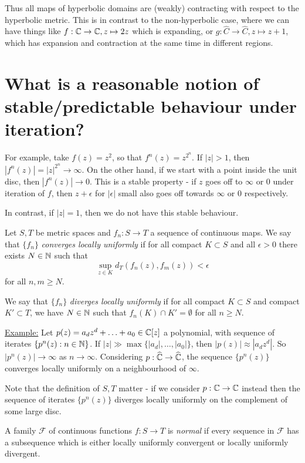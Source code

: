 \documentclass[10pt,a4paper]{article}
\begin{document}
Thus all maps of hyperbolic domains are (weakly) contracting with respect to the hyperbolic metric. This is in contrast to the non-hyperbolic case, where we can have things like $f:\mathbb{C} \to \mathbb{C}, z \mapsto 2z$ which is expanding, or $g:\hat{C} \to \hat{C}, z\mapsto z+1$, which has expansion and contraction at the same time in different regions.

\section{What is a reasonable notion of stable/predictable behaviour under iteration?}

For example, take $f(z) = z^2$, so that $f^n(z) = z^{2^n}$. If $|z| > 1$, then $|f^n(z)| = |z|^{2^n} \to \infty$. On the other hand, if we start with a point inside the unit disc, then $|f^n(z)| \to 0$. This is a stable property - if $z$ goes off to $\infty$ or $0$ under iteration of $f$, then $z+\epsilon$ for $|\epsilon|$ small also goes off towards $\infty$ or 0 respectively.

In contrast, if $|z|=1$, then we do not have this stable behaviour.

\begin{definition}
  Let $S, T$ be metric spaces and $f_n : S \to T$ a sequence of continuous maps. We say that $\{f_n\}$ \emph{converges locally uniformly} if for all compact $K \subset S$ and all $\epsilon >0$ there exists $N \in \mathbb{N}$ such that
  \[
    \sup_{z \in K} d_T(f_n(z), f_m(z)) < \epsilon
  \]
  for all $n, m \geq N$.

  We say that $\{f_n\}$ \emph{diverges locally uniformly} if for all compact $K \subset S$ and compact $K' \subset T$, we have $N \in \mathbb{N}$ such that $f_n(K) \cap K' = \emptyset$ for all $n \geq N$.
\end{definition}

\underline{Example:} Let $p(z) = a_dz^d + \ldots + a_0 \in \mathbb{C}[z]$ a polynomial, with sequence of iterates $\{p^n(z) : n \in \mathbb{N}\}$. If $|z| \gg \max\{|a_d|, \ldots, |a_0|\}$, then $|p(z)| \approx |a_dz^d|$. So $|p^n(z)| \to \infty$ as $n \to \infty$. Considering $p:\widehat{\mathbb{C}} \to \widehat{\mathbb{C}}$, the sequence $\{p^n(z)\}$ converges locally uniformly on a neighbourhood of $\infty$.

Note that the definition of $S, T$ matter - if we consider $p:\mathbb{C} \to \mathbb{C}$ instead then the sequence of iterates $\{p^n(z)\}$ diverges locally uniformly on the complement of some large disc.

\begin{definition}
  A family $\mathcal{F}$ of continuous functions $f: S \to T$ is \emph{normal} if every sequence in $\mathcal{F}$ has a subsequence which is either locally uniformly convergent or locally uniformly divergent.
\end{definition}
\end{document}
